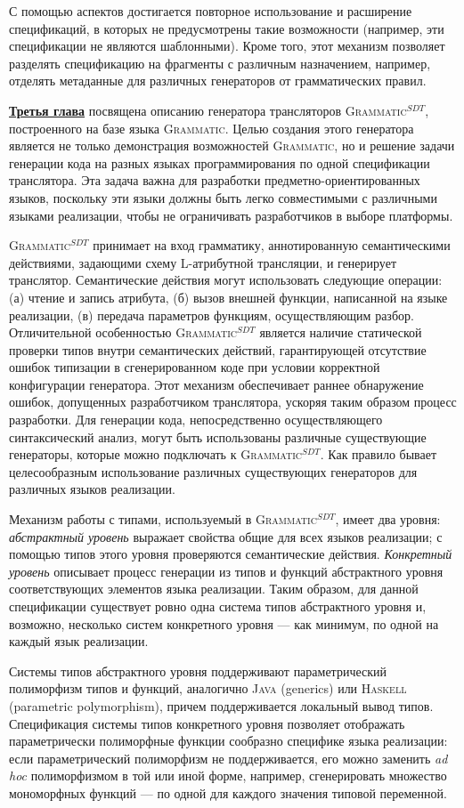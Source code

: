 \documentclass[12pt,a4paper]{article}
\newcommand{\term}[1]{\emph{#1}}
\newcommand{\tool}[1]{\textsc{#1}}
\theoremstyle{definition}
\theoremstyle{plain}
\newcommand{\GRM}{\tool{Grammatic}}
\newcommand{\ATF}{\tool{Grammatic$^{SDT}$}}
\newcommand{\afsubsection}[1]{\par \textbf{\underline{#1}}}
\begin{document}
С помощью аспектов достигается повторное использование  и расширение спецификаций, в которых не предусмотрены такие возможности (например, эти спецификации не являются шаблонными). Кроме того, этот механизм позволяет разделять спецификацию на фрагменты с различным назначением, например, отделять метаданные для различных генераторов от грамматических правил.

\afsubsection{Третья глава} посвящена описанию генератора трансляторов \ATF{}, построенного на базе языка \GRM{}. Целью создания этого генератора является не только демонстрация возможностей \GRM{}, но и решение задачи генерации кода на разных языках программирования по одной спецификации транслятора. Эта задача важна для разработки предметно-ориентированных языков, поскольку эти языки должны быть легко совместимыми с различными языками реализации, чтобы не ограничивать разработчиков в выборе платформы.

\ATF{} принимает на вход грамматику, аннотированную семантическими действиями, задающими схему L-атрибутной трансляции, и генерирует транслятор. Семантические действия могут использовать следующие операции: (а) чтение и запись атрибута, (б) вызов внешней функции, написанной на языке реализации, (в) передача параметров функциям, осуществляющим разбор. 
Отличительной особенностью \ATF{} является наличие статической проверки типов внутри семантических действий, гарантирующей отсутствие ошибок типизации в сгенерированном коде при условии корректной конфигурации генератора. Этот механизм обеспечивает раннее обнаружение ошибок, допущенных разработчиком транслятора, ускоряя таким образом процесс разработки.
Для генерации кода, непосредственно осуществляющего синтаксический анализ, могут быть использованы различные существующие генераторы, которые можно подключать к \ATF{}. Как правило бывает целесообразным использование различных существующих генераторов для различных языков реализации.

Механизм работы с типами, используемый в \ATF{}, имеет два уровня: \term{абстрактный уровень} выражает свойства общие для всех языков реализации; с помощью типов этого уровня проверяются семантические действия. \term{Конкретный уровень} описывает процесс генерации из типов и функций абстрактного уровня соответствующих элементов языка реализации. Таким образом, для данной спецификации существует ровно одна система типов абстрактного уровня и, возможно, несколько систем конкретного уровня --- как минимум, по одной на каждый язык реализации.

Системы типов абстрактного уровня поддерживают параметрический полиморфизм типов и функций, аналогично \tool{Java} (generics) или \tool{Haskell} (parametric polymorphism), причем поддерживается локальный вывод типов. Спецификация системы типов конкретного уровня позволяет отображать параметрически полиморфные функции сообразно специфике языка реализации: если параметрический полиморфизм не поддерживается, его можно заменить \term{ad hoc} полиморфизмом в той или иной форме, например, сгенерировать множество мономорфных функций --- по одной для каждого значения типовой переменной. 
\end{document}
